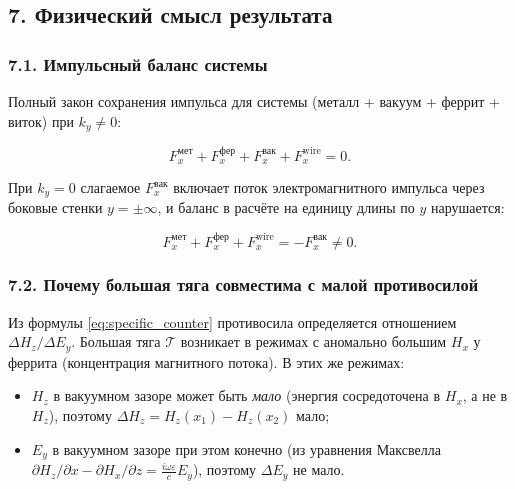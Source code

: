 \documentclass[11pt]{article}
\providecommand{\tightlist}{%
      \setlength{\itemsep}{0pt}\setlength{\parskip}{0pt}}
\begin{document}
    \subsection{7. Физический смысл
результата}\label{ux444ux438ux437ux438ux447ux435ux441ux43aux438ux439-ux441ux43cux44bux441ux43b-ux440ux435ux437ux443ux43bux44cux442ux430ux442ux430}

\subsubsection{7.1. Импульсный баланс
системы}\label{ux438ux43cux43fux443ux43bux44cux441ux43dux44bux439-ux431ux430ux43bux430ux43dux441-ux441ux438ux441ux442ux435ux43cux44b}

Полный закон сохранения импульса для системы (металл + вакуум + феррит +
виток) при \(k_y \neq 0\):

\begin{equation*}
    F_x^{\mathrm{мет}} + F_x^{\mathrm{фер}}
    + F_x^{\mathrm{вак}}
    + F_x^{\mathrm{wire}} = 0.
\end{equation*}

При \(k_y = 0\) слагаемое \(F_x^{\mathrm{вак}}\) включает поток
электромагнитного импульса через боковые стенки \(y = \pm\infty\), и
баланс в расчёте на единицу длины по \(y\) нарушается:

\begin{equation*}
    F_x^{\mathrm{мет}} + F_x^{\mathrm{фер}} + F_x^{\mathrm{wire}}
    = -F_x^{\mathrm{вак}}
    \neq 0.
\end{equation*}

\subsubsection{7.2. Почему большая тяга совместима с малой
противосилой}\label{ux43fux43eux447ux435ux43cux443-ux431ux43eux43bux44cux448ux430ux44f-ux442ux44fux433ux430-ux441ux43eux432ux43cux435ux441ux442ux438ux43cux430-ux441-ux43cux430ux43bux43eux439-ux43fux440ux43eux442ux438ux432ux43eux441ux438ux43bux43eux439}

Из формулы \eqref{eq:specific_counter} противосила определяется
отношением \(\Delta H_z / \Delta E_y\). Большая тяга \(\mathcal{T}\)
возникает в режимах с аномально большим \(H_x\) у феррита (концентрация
магнитного потока). В этих же режимах:

\begin{itemize}
\tightlist
\item
  \(H_z\) в вакуумном зазоре может быть \emph{мало} (энергия
  сосредоточена в \(H_x\), а не в \(H_z\)), поэтому
  \(\Delta H_z = H_z(x_1) - H_z(x_2)\) мало;
\item
  \(E_y\) в вакуумном зазоре при этом конечно (из уравнения Максвелла
  \(\partial H_z/\partial x -  \partial H_x/\partial z = \frac{i\omega\varepsilon}{c}E_y\)),
  поэтому \(\Delta E_y\) не мало.
\end{itemize}
\end{document}
